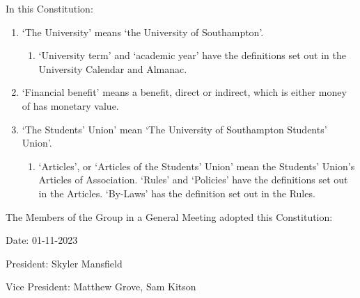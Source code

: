 \documentclass[12pt]{constitution}
\begin{document}
In this Constitution:
\begin{enumerate}
    \item `The University' means `the University of Southampton'.
    \begin{enumerate}
        \item `University term' and `academic year' have the definitions set out in the University Calendar and Almanac.
    \end{enumerate}

    \item `Financial benefit' means a benefit, direct or indirect, which is either money of has monetary value.
    \item `The Students' Union' mean `The University of Southampton Students' Union'.
    \begin{enumerate}
        \item `Articles', or `Articles of the Students' Union' mean the Students' Union's Articles of Association. `Rules' and `Policies' have the definitions set out in the Articles. `By-Laws' has the definition set out in the Rules.
    \end{enumerate}
\end{enumerate}


\label{clause:declaration}

The Members of the Group in a General Meeting adopted this Constitution:

Date: 01-11-2023

President: Skyler Mansfield

Vice President: Matthew Grove, Sam Kitson
\end{document}
